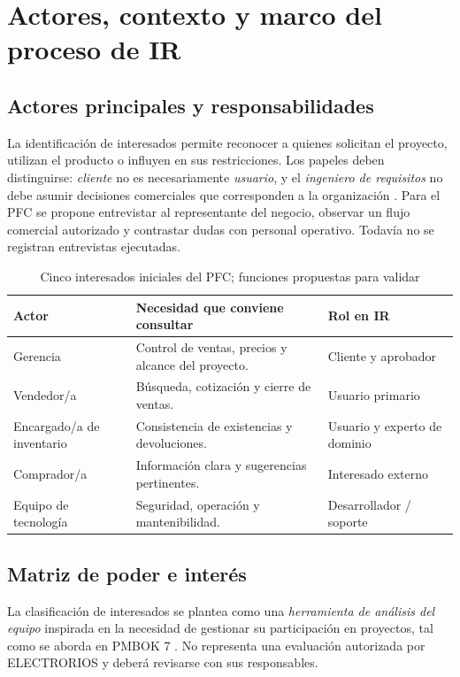 \section{Actores, contexto y marco del proceso de IR}
\subsection{Actores principales y responsabilidades}
La identificaci\'on de interesados permite reconocer a quienes solicitan el proyecto, utilizan el producto o influyen en sus restricciones. Los papeles deben distinguirse: \emph{cliente} no es necesariamente \emph{usuario}, y el \emph{ingeniero de requisitos} no debe asumir decisiones comerciales que corresponden a la organizaci\'on \cite{pohl2025,swebok2024}. Para el PFC se propone entrevistar al representante del negocio, observar un flujo comercial autorizado y contrastar dudas con personal operativo. Todav\'ia no se registran entrevistas ejecutadas.

\begin{table}[!ht]
\centering\scriptsize
\caption{Cinco interesados iniciales del PFC; funciones propuestas para validar}
\label{tab:stakeholders}
\begin{tabularx}{\columnwidth}{@{}P{1.43cm}Y P{1.25cm}@{}}
\toprule Actor & Necesidad que conviene consultar & Rol en IR\\\midrule
Gerencia & Control de ventas, precios y alcance del proyecto. & Cliente y aprobador\\
Vendedor/a & B\'usqueda, cotizaci\'on y cierre de ventas. & Usuario primario\\
Encargado/a de inventario & Consistencia de existencias y devoluciones. & Usuario y experto de dominio\\
Comprador/a & Informaci\'on clara y sugerencias pertinentes. & Interesado externo\\
Equipo de tecnolog\'ia & Seguridad, operaci\'on y mantenibilidad. & Desarrollador / soporte\\
\bottomrule
\end{tabularx}
\end{table}

\subsection{Matriz de poder e inter\'es}
La clasificaci\'on de interesados se plantea como una \emph{herramienta de an\'alisis del equipo} inspirada en la necesidad de gestionar su participaci\'on en proyectos, tal como se aborda en PMBOK 7 \cite{pmbok2021}. No representa una evaluaci\'on autorizada por ELECTRORIOS y deber\'a revisarse con sus responsables.

